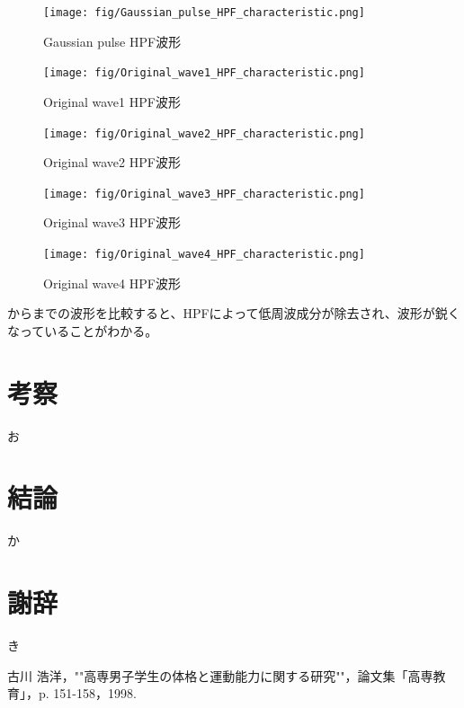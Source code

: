 \documentclass[11pt,dvipdfmx]{jarticle}
\begin{document}
\begin{figure}[H]
  \centering
  \texttt{[image: fig/Gaussian\_pulse\_HPF\_characteristic.png]}
  \caption{Gaussian pulse HPF波形}
  \label{fig:Gaussian_pulse_HPF}
\end{figure}
\begin{figure}[H]
  \centering
  \texttt{[image: fig/Original\_wave1\_HPF\_characteristic.png]}
  \caption{Original wave1 HPF波形}
  \label{fig:Original_wave1_HPF}
\end{figure}
\begin{figure}[H]
  \centering
  \texttt{[image: fig/Original\_wave2\_HPF\_characteristic.png]}
  \caption{Original wave2 HPF波形}
  \label{fig:Original_wave2_HPF}
\end{figure}
\begin{figure}[H]
  \centering
  \texttt{[image: fig/Original\_wave3\_HPF\_characteristic.png]}
  \caption{Original wave3 HPF波形}
  \label{fig:Original_wave3_HPF}
\end{figure}
\begin{figure}[H]
  \centering
  \texttt{[image: fig/Original\_wave4\_HPF\_characteristic.png]}
  \caption{Original wave4 HPF波形}
  \label{fig:Original_wave4_HPF}
\end{figure}
からまでの波形を比較すると、HPFによって低周波成分が除去され、波形が鋭くなっていることがわかる。

\section{考察}
お

\section{結論}
か

\section{謝辞}
き


\begin{thebibliography}{99}
 古川 浩洋，""高専男子学生の体格と運動能力に関する研究""，論文集「高専教育」，p. 151-158，1998.
\end{thebibliography}
\end{document}
